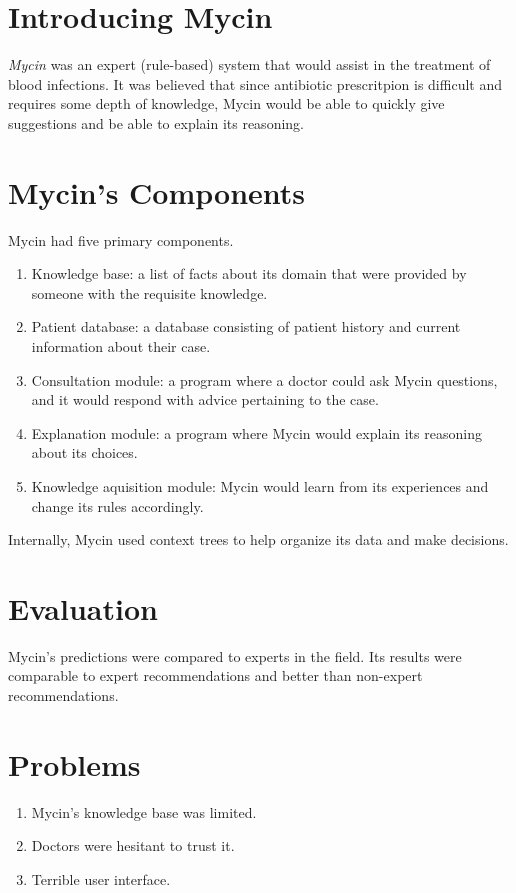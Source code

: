 \documentclass{article}
\begin{document}
\section*{Introducing Mycin}
\textit{Mycin} was an expert (rule-based) system that would assist in the
treatment of blood infections.  It was believed that since antibiotic
prescritpion is difficult and requires some depth of knowledge, Mycin would be
able to quickly give suggestions and be able to explain its reasoning.

\section*{Mycin's Components}
Mycin had five primary components.
\begin{enumerate}
    \item Knowledge base: a list of facts about its domain that were provided
        by someone with the requisite knowledge.
    \item Patient database: a database consisting of patient history and
        current information about their case.
    \item Consultation module: a program where a doctor could ask Mycin
        questions, and it would respond with advice pertaining to the case.
    \item Explanation module: a program where Mycin would explain its
        reasoning about its choices.
    \item Knowledge aquisition module: Mycin would learn from its experiences
        and change its rules accordingly.
\end{enumerate}
Internally, Mycin used context trees to help organize its data and make decisions.

\section*{Evaluation}
Mycin's predictions were compared to experts in the field.  Its results were
comparable to expert recommendations and better than non-expert
recommendations.

\section*{Problems}
\begin{enumerate}
    \item Mycin's knowledge base was limited.
    \item Doctors were hesitant to trust it.
    \item Terrible user interface.
\end{enumerate}
\end{document}
